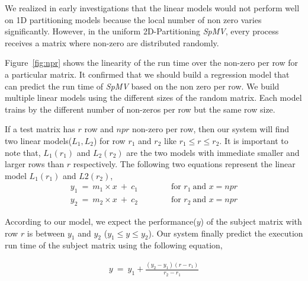 \documentclass[sigconf,review,anonymous]{acmart}
\begin{document}
We realized in early investigations that the linear models would not
perform well on 1D partitioning models because the local number of non
zero varies significantly. However, in the uniform 2D-Partitioning
\textit{SpMV}, every process receives a matrix where non-zero are
distributed randomly.

Figure~\ref{fig:npr} shows the linearity of the run time over the
non-zero per row for a particular matrix. It confirmed that we should
build a regression model that can predict the run time of
\textit{SpMV} based on the non zero per row. We build multiple linear
models using the different sizes of the random matrix. Each model
trains by the different number of non-zeros per row but the same row
size.

If a test matrix has $r$ row and $npr$ non-zero per row, then our
system will find two linear models($L_1, L_2$) for row $r_1$ and $r_2$
like $r_1\leq r\leq r_2$.  It is important to note that, $L_1(r_1)$
and $L_2(r_2)$ are the two models with immediate smaller and larger rows
than $r$ respectively.  The following two equations represent the
linear model $L_1(r_1)$ and $L2(r_2)$,
\begin{equation*}
\begin{array}{l}
y_1\ =\ m_1\times x\ +\ c_1  \qquad\qquad\text{for } r_1 \ \text{and } x=npr\\
y_2\ =\ m_2\times x\ +\ c_2  \qquad\qquad\text{for } r_2 \ \text{and } x=npr
\end{array}
\end{equation*}

According to our model, we expect the performance($y$) of the subject
matrix with row $r$ is between $y_1$ and $y_2$ ($y_1\leq y\leq
y_2$). Our system finally predict the execution run time of the
subject matrix using the following equation,

\begin{equation*}
\begin{array}{l}
y\ =\ y_1+\frac{(y_2-y_1) (r-r_1)}{r_2-r_1}
\end{array}
\end{equation*}
\end{document}
